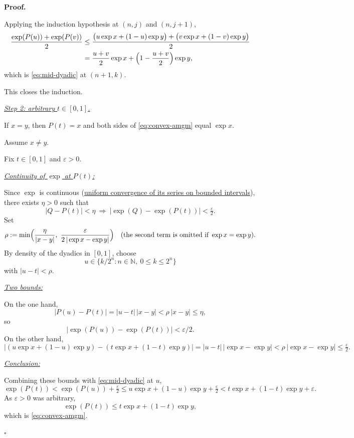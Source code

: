 \documentclass[11pt,reqno]{amsart}
\providecommand{\N}{\mathbb{N}}
\theoremstyle{redplain}
\renewcommand{\qedsymbol}{\textcolor{proofqed}{\ensuremath{\square}}}
\renewenvironment{proof}[1][Proof]{\par\noindent\textbf{\textcolor{proofhead}{#1.}}\par\nobreak}{\par\nobreak\hfill\qedsymbol}
\numberwithin{equation}{section}
\begin{document}
\begin{proof}
Applying the induction hypothesis at $(n,j)$ and $(n,j+1)$, 
\begin{align*}
\frac{\exp (P(u))+\exp (P(v))}{2}& \leq \frac{\bigl(u\exp x+(1-u)\exp y\bigr)%
+\bigl(v\exp x+(1-v)\exp y\bigr)}{2} \\
& =\frac{u+v}{2}\exp x+\Bigl(1-\frac{u+v}{2}\Bigr)\exp y,
\end{align*}%
which is \cref{eq:mid-dyadic} at $(n{+}1,k)$.

This closes the induction.

\noindent\underline{{\large \emph{Step 2: arbitrary $t\in[0,1]$.}}}

\noindent If $x=y$, then $P(t)=x$ and both sides of \cref{eq:convex-amgm}
equal $\exp x$.

Assume $x\neq y$.

Fix $t\in [0,1]$ and $\varepsilon >0$.

\underline{\emph{Continuity of $\exp $ at $P(t)$:} }

Since $\exp $ is continuous (\hyperref[Uniformconvergence]{uniform
convergence of its series on bounded intervals}), there exists $\eta >0$
such that 
\begin{equation*}
|Q-P(t)|<\eta \ \Longrightarrow \ |\exp (Q)-\exp (P(t))|<\tfrac{\varepsilon 
}{2}.
\end{equation*}%
Set 
\begin{equation*}
\rho :=\min \Bigl(\frac{\eta }{|x-y|},\ \frac{\varepsilon }{2\,|\exp x-\exp
y|}\Bigr)\quad (\text{the second term is omitted if }\exp x=\exp y).
\end{equation*}%
By density of the dyadics in $[0,1]$, choose 
\begin{equation*}
u\in \{k/2^{n}:n\in \N,\ 0\leq k\leq 2^{n}\}
\end{equation*}%
with $|u-t|<\rho $.

\underline{\emph{Two bounds:} }

On the one hand, 
\begin{equation*}
|P(u)-P(t)|=|u-t|\,|x-y|<\rho \,|x-y|\leq \eta ,
\end{equation*}%
so 
\begin{equation*}
|\exp (P(u))-\exp (P(t))|<\varepsilon /2.
\end{equation*}%
On the other hand, 
\begin{equation*}
\bigl|(u\exp x+(1-u)\exp y)-(t\exp x+(1-t)\exp y)\bigr|=|u-t|\,|\exp x-\exp
y|<\rho \,|\exp x-\exp y|\leq \tfrac{\varepsilon }{2}.
\end{equation*}

\underline{\emph{Conclusion:} }

Combining these bounds with \cref{eq:mid-dyadic} at $u$, 
\begin{equation*}
\exp (P(t))<\exp (P(u))+\tfrac{\varepsilon }{2}\leq u\exp x+(1-u)\exp y+%
\tfrac{\varepsilon }{2}<t\exp x+(1-t)\exp y+\varepsilon .
\end{equation*}%
As $\varepsilon >0$ was arbitrary, 
\begin{equation*}
\exp (P(t))\leq t\exp x+(1-t)\exp y,
\end{equation*}%
which is \cref{eq:convex-amgm}.
\end{proof}
\end{document}
